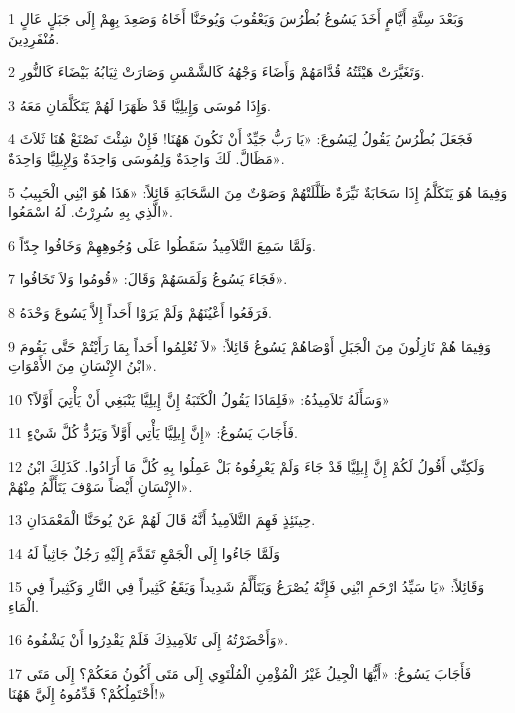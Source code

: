 \par 1 وَبَعْدَ سِتَّةِ أَيَّامٍ أَخَذَ يَسُوعُ بُطْرُسَ وَيَعْقُوبَ وَيُوحَنَّا أَخَاهُ وَصَعِدَ بِهِمْ إِلَى جَبَلٍ عَالٍ مُنْفَرِدِينَ.
\par 2 وَتَغَيَّرَتْ هَيْئَتُهُ قُدَّامَهُمْ وَأَضَاءَ وَجْهُهُ كَالشَّمْسِ وَصَارَتْ ثِيَابُهُ بَيْضَاءَ كَالنُّورِ.
\par 3 وَإِذَا مُوسَى وَإِيلِيَّا قَدْ ظَهَرَا لَهُمْ يَتَكَلَّمَانِ مَعَهُ.
\par 4 فَجَعَلَ بُطْرُسُ يَقُولُ لِيَسُوعَ: «يَا رَبُّ جَيِّدٌ أَنْ نَكُونَ هَهُنَا! فَإِنْ شِئْتَ نَصْنَعْ هُنَا ثَلاَثَ مَظَالَّ. لَكَ وَاحِدَةٌ وَلِمُوسَى وَاحِدَةٌ وَلِإِيلِيَّا وَاحِدَةٌ».
\par 5 وَفِيمَا هُوَ يَتَكَلَّمُ إِذَا سَحَابَةٌ نَيِّرَةٌ ظَلَّلَتْهُمْ وَصَوْتٌ مِنَ السَّحَابَةِ قَائِلاً: «هَذَا هُوَ ابْنِي الْحَبِيبُ الَّذِي بِهِ سُرِرْتُ. لَهُ اسْمَعُوا».
\par 6 وَلَمَّا سَمِعَ التَّلاَمِيذُ سَقَطُوا عَلَى وُجُوهِهِمْ وَخَافُوا جِدّاً.
\par 7 فَجَاءَ يَسُوعُ وَلَمَسَهُمْ وَقَالَ: «قُومُوا وَلاَ تَخَافُوا».
\par 8 فَرَفَعُوا أَعْيُنَهُمْ وَلَمْ يَرَوْا أَحَداً إِلاَّ يَسُوعَ وَحْدَهُ.
\par 9 وَفِيمَا هُمْ نَازِلُونَ مِنَ الْجَبَلِ أَوْصَاهُمْ يَسُوعُ قَائِلاً: «لاَ تُعْلِمُوا أَحَداً بِمَا رَأَيْتُمْ حَتَّى يَقُومَ ابْنُ الإِنْسَانِ مِنَ الأَمْوَاتِ».
\par 10 وَسَأَلَهُ تَلاَمِيذُهُ: «فَلِمَاذَا يَقُولُ الْكَتَبَةُ إِنَّ إِيلِيَّا يَنْبَغِي أَنْ يَأْتِيَ أَوَّلاً؟»
\par 11 فَأَجَابَ يَسُوعُ: «إِنَّ إِيلِيَّا يَأْتِي أَوَّلاً وَيَرُدُّ كُلَّ شَيْءٍ.
\par 12 وَلَكِنِّي أَقُولُ لَكُمْ إِنَّ إِيلِيَّا قَدْ جَاءَ وَلَمْ يَعْرِفُوهُ بَلْ عَمِلُوا بِهِ كُلَّ مَا أَرَادُوا. كَذَلِكَ ابْنُ الإِنْسَانِ أَيْضاً سَوْفَ يَتَأَلَّمُ مِنْهُمْ».
\par 13 حِينَئِذٍ فَهِمَ التَّلاَمِيذُ أَنَّهُ قَالَ لَهُمْ عَنْ يُوحَنَّا الْمَعْمَدَانِ.
\par 14 وَلَمَّا جَاءُوا إِلَى الْجَمْعِ تَقَدَّمَ إِلَيْهِ رَجُلٌ جَاثِياً لَهُ
\par 15 وَقَائِلاً: «يَا سَيِّدُ ارْحَمِ ابْنِي فَإِنَّهُ يُصْرَعُ وَيَتَأَلَّمُ شَدِيداً وَيَقَعُ كَثِيراً فِي النَّارِ وَكَثِيراً فِي الْمَاءِ.
\par 16 وَأَحْضَرْتُهُ إِلَى تَلاَمِيذِكَ فَلَمْ يَقْدِرُوا أَنْ يَشْفُوهُ».
\par 17 فَأَجَابَ يَسُوعُ: «أَيُّهَا الْجِيلُ غَيْرُ الْمُؤْمِنِ الْمُلْتَوِي إِلَى مَتَى أَكُونُ مَعَكُمْ؟ إِلَى مَتَى أَحْتَمِلُكُمْ؟ قَدِّمُوهُ إِلَيَّ هَهُنَا!»
